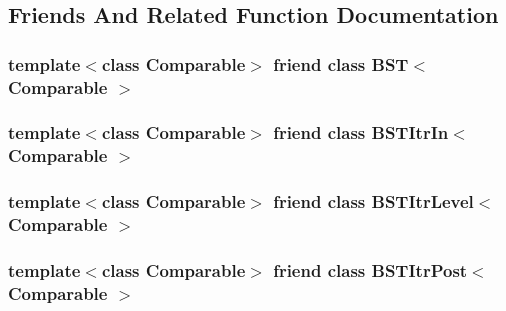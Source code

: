 \subsection{Friends And Related Function Documentation}
\hypertarget{class_binary_node_a28a1adb9906f3ff7e12c2cb6fa2bd54e}{
\subsubsection[{BST$<$ Comparable $>$}]{\setlength{\rightskip}{0pt plus 5cm}template$<$class Comparable$>$ friend class {\bf BST}$<$ Comparable $>$}}
\label{class_binary_node_a28a1adb9906f3ff7e12c2cb6fa2bd54e}
\hypertarget{class_binary_node_aab3993acac2ab24a0b59edb0c3acc775}{
\subsubsection[{BSTItrIn$<$ Comparable $>$}]{\setlength{\rightskip}{0pt plus 5cm}template$<$class Comparable$>$ friend class {\bf BSTItrIn}$<$ Comparable $>$}}
\label{class_binary_node_aab3993acac2ab24a0b59edb0c3acc775}
\hypertarget{class_binary_node_a26ff00bc0d87069aed877f10fd3c80a8}{
\subsubsection[{BSTItrLevel$<$ Comparable $>$}]{\setlength{\rightskip}{0pt plus 5cm}template$<$class Comparable$>$ friend class {\bf BSTItrLevel}$<$ Comparable $>$}}
\label{class_binary_node_a26ff00bc0d87069aed877f10fd3c80a8}
\hypertarget{class_binary_node_a5dc153694be266f6e772659486219da7}{
\subsubsection[{BSTItrPost$<$ Comparable $>$}]{\setlength{\rightskip}{0pt plus 5cm}template$<$class Comparable$>$ friend class {\bf BSTItrPost}$<$ Comparable $>$}}
